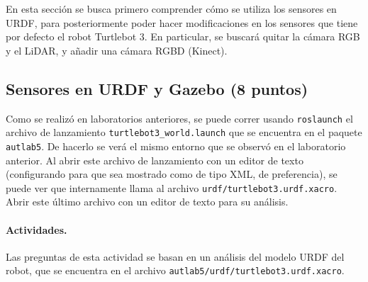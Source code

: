 \documentclass[a4paper,11pt]{robotlabs}
\begin{document}
En esta sección se busca primero comprender cómo se utiliza los sensores en
URDF, para posteriormente poder hacer modificaciones en los sensores que tiene
por defecto el robot Turtlebot 3. En particular, se buscará quitar la cámara
RGB y el LiDAR, y añadir una cámara RGBD (Kinect).

\subsection{Sensores en URDF y Gazebo (8 puntos) }

Como se realizó en laboratorios anteriores, se puede correr usando
\texttt{roslaunch} el archivo de lanzamiento \texttt{turtlebot3\_world.launch}
que se encuentra en el paquete \texttt{autlab5}. De hacerlo se verá el mismo
entorno que se observó en el laboratorio anterior. Al abrir este archivo de
lanzamiento con un editor de texto (configurando para que sea mostrado como de
tipo XML, de preferencia), se puede ver que internamente llama al archivo
\texttt{urdf/turtlebot3.urdf.xacro}. Abrir este último archivo con un editor de
texto para su análisis.


\paragraph{Actividades.} Las preguntas de esta actividad se basan en un
análisis del modelo URDF del robot, que se encuentra en el archivo
\texttt{autlab5/urdf/turtlebot3.urdf.xacro}.
\end{document}
